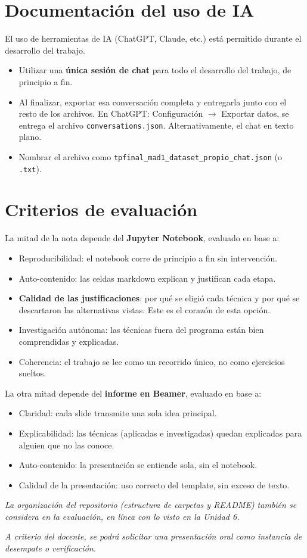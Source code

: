 \documentclass[11pt,a4paper]{article}
\newcommand{\codigo}[1]{\texttt{#1}}
\begin{document}
\section{Documentaci\'on del uso de IA}
El uso de herramientas de IA (ChatGPT, Claude, etc.) est\'a permitido durante el desarrollo del trabajo.
\begin{itemize}[leftmargin=2em,itemsep=2pt]
    \item Utilizar una \textbf{\'unica sesi\'on de chat} para todo el desarrollo del trabajo, de principio a fin.
    \item Al finalizar, exportar esa conversaci\'on completa y entregarla junto con el resto de los archivos. En ChatGPT: Configuraci\'on $\rightarrow$ Exportar datos, se entrega el archivo \codigo{conversations.json}. Alternativamente, el chat en texto plano.
    \item Nombrar el archivo como \codigo{tpfinal\_mad1\_dataset\_propio\_chat.json} (o \codigo{.txt}).
\end{itemize}

\section{Criterios de evaluaci\'on}
La mitad de la nota depende del \textbf{Jupyter Notebook}, evaluado en base a:
\begin{itemize}[leftmargin=2em,itemsep=2pt]
    \item Reproducibilidad: el notebook corre de principio a fin sin intervenci\'on.
    \item Auto-contenido: las celdas markdown explican y justifican cada etapa.
    \item \textbf{Calidad de las justificaciones}: por qu\'e se eligi\'o cada t\'ecnica y por qu\'e se descartaron las alternativas vistas. Este es el coraz\'on de esta opci\'on.
    \item Investigaci\'on aut\'onoma: las t\'ecnicas fuera del programa est\'an bien comprendidas y explicadas.
    \item Coherencia: el trabajo se lee como un recorrido \'unico, no como ejercicios sueltos.
\end{itemize}

La otra mitad depende del \textbf{informe en Beamer}, evaluado en base a:
\begin{itemize}[leftmargin=2em,itemsep=2pt]
    \item Claridad: cada slide transmite una sola idea principal.
    \item Explicabilidad: las t\'ecnicas (aplicadas e investigadas) quedan explicadas para alguien que no las conoce.
    \item Auto-contenido: la presentaci\'on se entiende sola, sin el notebook.
    \item Calidad de la presentaci\'on: uso correcto del template, sin exceso de texto.
\end{itemize}

\textit{La organizaci\'on del repositorio (estructura de carpetas y README) tambi\'en se considera en la evaluaci\'on, en l\'inea con lo visto en la Unidad 6.}

\textit{A criterio del docente, se podr\'a solicitar una presentaci\'on oral como instancia de desempate o verificaci\'on.}
\end{document}
